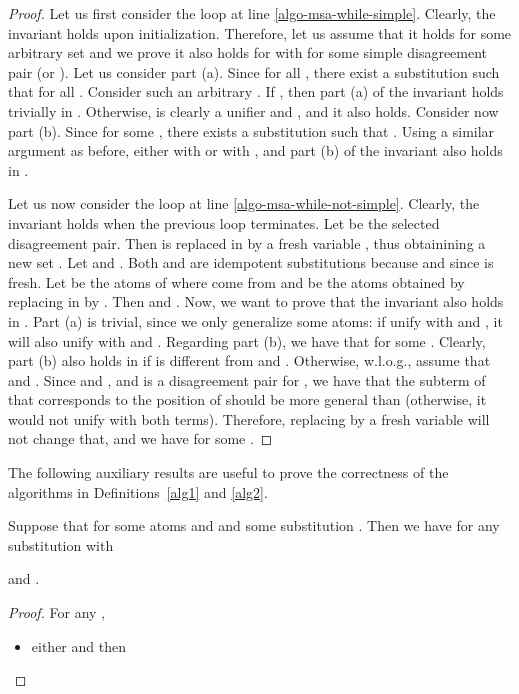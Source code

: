 \documentclass[fleqn]{tlp}
\begin{document}
\begin{appendix}
\begin{proof}
  Let us first consider the loop at line
  \ref{algo-msa-while-simple}. Clearly, the invariant holds upon
  initialization. Therefore, let us assume that it holds for some
  arbitrary set  and we prove it also holds for 
  with  for some simple disagreement pair  (or
  ).  
Let us consider part (a).  Since  for all ,
  there exist a substitution  such that  for
  all . Consider such an arbitrary . If
  , then part (a) of the invariant holds trivially in
  . Otherwise,  is clearly a unifier  and ,
  and it also holds. 
Consider now part (b). Since  for some , there
  exists a substitution  such that . Using a
  similar argument as before, either  with  or
   with , and part (b) of
  the invariant also holds in .

  Let us now consider the loop at line
  \ref{algo-msa-while-not-simple}. Clearly, the invariant holds when
  the previous loop terminates. 
Let  be the selected disagreement pair.
  Then  is replaced in  by a fresh variable
  , thus obtainining a new set .
  Let  and . Both  and 
  are idempotent substitutions because  and  since  is fresh.
  Let  be the atoms of  where  come from
  and  be the atoms obtained by replacing
   in  by . Then  and
  . 
Now, we want to prove that the invariant also holds in . Part (a) is trivial, since
  we only generalize some atoms: if  unify with  and , it
  will also unify with  and . Regarding part (b), we have
  that  for some . Clearly, part (b) also holds in
   if  is different from  and . Otherwise,
  w.l.o.g., assume that  and . Since 
  and , and  is a disagreement pair for ,
  we have that the subterm of  that corresponds to the position of
   should be more general than  (otherwise, it would not
  unify with both terms). Therefore, replacing  by a fresh variable
   will not change that, and we have  for some
  .
\end{proof}
The following auxiliary results are useful to prove the correctness of
the algorithms in Definitions~\ref{alg1} and \ref{alg2}. 

\begin{lemma}\label{lemma:technical-1}
  Suppose that  for some atoms  and 
  and some substitution .
  Then we have  for any
  substitution  with
  
  and
  .
\end{lemma}
\begin{proof}
  For any , 
  \begin{itemize}
  \item either  and then 
    

\end{itemize}
\end{proof}
\end{appendix}
\end{document}
